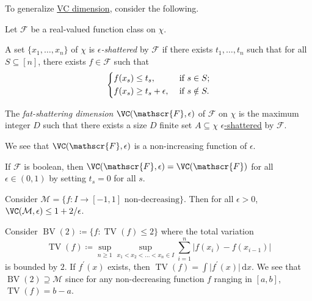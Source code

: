 To generalize \hyperref[def:VC-dimension]{VC dimension}, consider the following.

\begin{definition*}
	Let \(\mathscr{F} \) be a real-valued function class on \(\chi \).
	\begin{definition}\label{def:eps-shattered}
		A set \(\{ x_1, \dots , x_n \} \) of \(\chi \) is \emph{\(\epsilon \)-shattered} by \(\mathscr{F} \) if there exists \(t_1, \dots , t_n\) such that for all \(S \subseteq [n]\), there exists \(f\in \mathscr{F} \) such that
		\[
			\begin{dcases}
				f(x_s) \leq t_s,             & \text{ if } s\in S ;   \\
				f(x_s) \geq t_s + \epsilon , & \text{ if } s\notin S.
			\end{dcases}
		\]
	\end{definition}

	\begin{definition}\label{def:fat-shattering-dimension}
		The \emph{fat-shattering dimension} \(\VC(\mathscr{F}, \epsilon)\) of \(\mathscr{F} \) on \(\chi \) is the maximum integer \(D\) such that there exists a size \(D\) finite set \(A \subseteq \chi \) \hyperref[def:eps-shattered]{\(\epsilon\)-shattered} by \(\mathscr{F} \).
	\end{definition}
\end{definition*}

\begin{remark}
	We see that \(\VC(\mathscr{F} , \epsilon )\) is a non-increasing function of \(\epsilon \).
\end{remark}

\begin{note}
	If \(\mathscr{F} \) is boolean, then \(\VC(\mathscr{F} , \epsilon ) = \VC(\mathscr{F} )\) for all \(\epsilon \in (0, 1)\) by setting \(t_s = 0\) for all \(s\).
\end{note}

\begin{eg}
	Consider \(\mathcal{M} = \{ f\colon I \to [-1, 1] \text{ non-decreasing}  \} \). Then for all \(\epsilon > 0\), \(\VC(\mathcal{M} , \epsilon ) \leq 1 + 2 / \epsilon \).
\end{eg}

\begin{eg}
	Consider \(\mathop{\mathrm{BV}}(2) \coloneqq \{ f \colon \mathop{\mathrm{TV}}(f) \leq 2 \} \) where the total variation
	\[
		\mathop{\mathrm{TV}}(f) \coloneqq \sup _{n \geq 1} \sup _{x_1 < x_2 < \dots < x_n \in I} \sum_{i=1}^{n} \vert f(x_i) - f(x_{i-1}) \vert
	\]
	is bounded by \(2\). If \(f^{\prime} (x)\) exists, then \(\mathop{\mathrm{TV}}(f) = \int \vert f^{\prime} (x) \vert \,\mathrm{d} x\). We see that \(\mathop{\mathrm{BV}}(2) \supseteq \mathcal{M} \) since for any non-decreasing function \(f\) ranging in \([a, b]\), \(\mathop{\mathrm{TV}}(f) = b - a\).
\end{eg}

